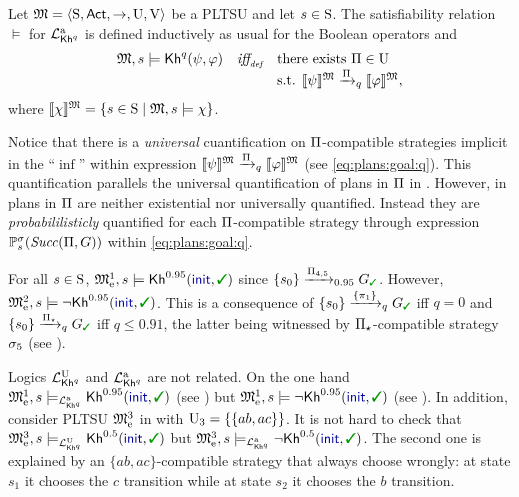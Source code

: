\begin{definition}\label{def:semantics:PKhadapt}
  Let $\model = \tup{\S,\Act,\ra,\Unc,\V}$ be a PLTSU and let $s\in\S$.  The
  satisfiability relation $\models$ for $\PKhadapt$ is defined inductively 
  as usual for the Boolean operators and
  \[
  \begin{array}{l@{\ \ \ }c@{\ \ \  }l}
    \model, s \models \kh^q(\psi,\varphi) & \iffdef &  \text{there exists } {\plans \in \Unc}  \\
    & & \text{s.t. } {\truthset{\model}{\psi} \reach{\plans}_q \truthset{\model}{\varphi}}, 
  \end{array}
  \]    
  where $\truthset{\model}{\chi} = \csetsc{s\in\S}{\model,s\models\chi}$.
\end{definition}

Notice that there is a \emph{universal} cuantification on
$\plans$-compatible strategies implicit in the ``$\inf$'' within
expression
$\truthset{\model}{\psi}\reach{\plans}_q\truthset{\model}{\varphi}$
(see \cref{eq:plans:goal:q}).
%
This quantification parallels the universal quantification of plans in
$\plans$ in .
%
However, in  plans in $\plans$ are
neither existential nor universally quantified.  Instead they are
\emph{probabililisticly} quantified for each $\plans$-compatible
strategy through expression $\Prob^\strat_s(\Succ(\plans,G))$ within
\cref{eq:plans:goal:q}.


\begin{example}\label{ex:running:pkhadapt}
  For all $s\in\S$, $\modelex^1,s \models \kh^{0.95}(\init,\goal)$ since 
  $\{s_0\}\reach{\plans_{4,5}}_{0.95}G_{\goal}$.
  However, $\modelex^2,s \models \neg\kh^{0.95}(\init,\goal)$.  This
  is a consequence of $\{s_0\}\reach{\{\plan_1\}}_qG_{\goal}$ iff
  $q=0$ and $\{s_0\}\reach{\plans_{\star}}_qG_{\goal}$ iff $q\leq
  0.91$, the latter being witnessed by $\plans_{\star}$-compatible
  strategy $\strat_5$ (see ).
\end{example}


Logics $\PKhunc$ and $\PKhadapt$ are not related.
%
On the one hand
$\modelex^1,s \models_\PKhadapt \kh^{0.95}(\init,\goal)$
(see ) but
$\modelex^1,s \models \neg\kh^{0.95}(\init,\goal)$
(see ).
%
In addition, consider PLTSU $\modelex^3$ in 
with $\Unc_3=\{\{ab,ac\}\}$.  It is not hard to check that
$\modelex^3,s \models_\PKhunc \kh^{0.5}(\init,\goal)$ but 
$\modelex^3,s \models_\PKhadapt \neg\kh^{0.5}(\init,\goal)$.
The second one is explained by an $\{ab,ac\}$-compatible strategy that
always choose wrongly: at state $s_1$ it chooses the $c$ transition
while at state $s_2$ it chooses the $b$ transition.

